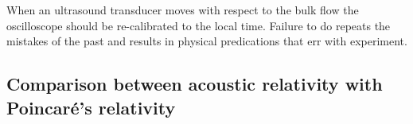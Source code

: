 \documentclass[10pt, fleqn,final,showtrims,oldfontcommands]{article} %
\newcommand{\secref}[1]{section~\ref{sec:#1}}
\newcommand{\eqnref}[1]{\ref{eqn:#1}}
\newcommand{\figref}[1]{Figure~\ref{fig:#1}}
\newcommand{\Poincare}{Poincar{\'e}}
\begin{document}
When an ultrasound transducer moves with respect to the bulk flow the oscilloscope should be re-calibrated to the local time.
Failure to do repeats the mistakes of the past and results in physical predications that err with experiment.



\subsection{Comparison between acoustic relativity with \Poincare's relativity}\label{sec:comparison}




\end{document}
